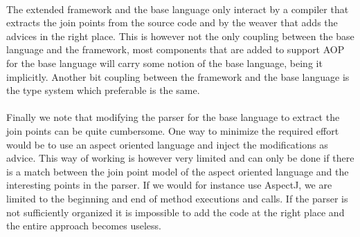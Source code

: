 \documentclass[a4paper]{report}
\begin{document}
\\
The extended framework and the base language only interact by a compiler that extracts the join points from the source code and by the weaver that adds the advices in the right place. This is however not the only coupling between the base language and the framework, most components that are added to support AOP for the base language will carry some notion of the base language, being it implicitly. Another bit coupling between the framework and the base language is the type system which preferable is the same.\\
\\
Finally we note that modifying the parser for the base language to extract the join points can be quite cumbersome. One way to minimize the required effort would be to use an aspect oriented language and inject the modifications as advice. This way of working is however very limited and can only be done if there is a match between the join point model of the aspect oriented language and the interesting points in the parser. If we would for instance use AspectJ, we are limited to the beginning and end of method executions and calls. If the parser is not sufficiently organized it is impossible to add the code at the right place and the entire approach becomes useless.
\end{document}
